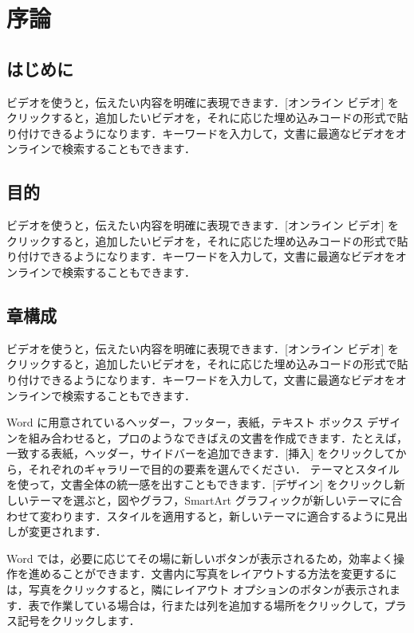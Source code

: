 \chapter{序論}	%
\thispagestyle{plain}   %


\section{はじめに}
ビデオを使うと\cite{item1}，伝えたい内容を明確に表現できます．[オンライン ビデオ] をクリックすると，追加したいビデオを，それに応じた埋め込みコードの形式で貼り付けできるようになります．キーワードを入力して，文書に最適なビデオをオンラインで検索することもできます．

\section{目的}
ビデオを使うと，伝えたい内容を明確に表現できます．[オンライン ビデオ] をクリックすると，追加したいビデオを，それに応じた埋め込みコードの形式で貼り付けできるようになります．キーワードを入力して，文書に最適なビデオをオンラインで検索することもできます．

\section{章構成}

ビデオを使うと，伝えたい内容を明確に表現できます．[オンライン ビデオ] をクリックすると，追加したいビデオを，それに応じた埋め込みコードの形式で貼り付けできるようになります．キーワードを入力して，文書に最適なビデオをオンラインで検索することもできます．

Word に用意されているヘッダー，フッター，表紙，テキスト ボックス デザインを組み合わせると，プロのようなできばえの文書を作成できます．たとえば，一致する表紙，ヘッダー，サイドバーを追加できます．[挿入] をクリックしてから，それぞれのギャラリーで目的の要素を選んでください．
テーマとスタイルを使って，文書全体の統一感を出すこともできます．[デザイン] をクリックし新しいテーマを選ぶと，図やグラフ，SmartArt グラフィックが新しいテーマに合わせて変わります．スタイルを適用すると，新しいテーマに適合するように見出しが変更されます．

Word では，必要に応じてその場に新しいボタンが表示されるため，効率よく操作を進めることができます．文書内に写真をレイアウトする方法を変更するには，写真をクリックすると，隣にレイアウト オプションのボタンが表示されます．表で作業している場合は，行または列を追加する場所をクリックして，プラス記号をクリックします．

